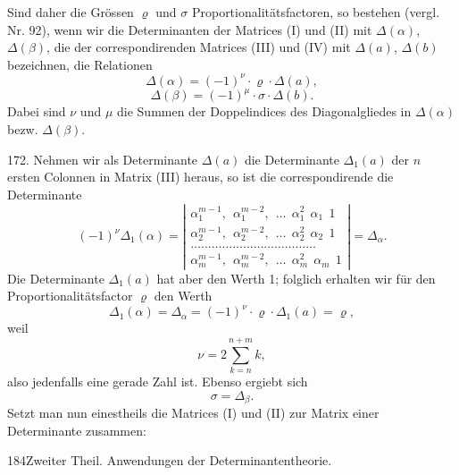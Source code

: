 \documentclass[11pt]{article}
\providecommand{\weberpage}[1]{}
\let\Delta\varDelta
\let\rho\varrho
\begin{document}
Sind daher die Grössen $\rho$ und $\sigma$ Proportionalitätsfactoren, so bestehen (vergl. Nr. 92), wenn wir die Determinanten der Matrices
(I) und (II) mit $\Delta(\alpha)$, $\Delta(\beta)$, die der correspondirenden Matrices (III)
und (IV) mit $\Delta(a)$, $\Delta(b)$ bezeichnen, die Relationen
\[
\Delta(\alpha) = (-1)^\nu\cdot\rho\cdot\Delta(a),
\]
\[
\Delta(\beta) = (-1)^\mu\cdot\sigma\cdot\Delta(b).
\]
Dabei sind $\nu$ und $\mu$ die Summen der Doppelindices des Diagonalgliedes in $\Delta(\alpha)$ bezw. $\Delta(\beta)$.

172. Nehmen wir als Determinante $\Delta(a)$ die Determinante $\Delta_1(a)$
der $n$ ersten Colonnen in Matrix (III) heraus, so ist die correspondirende die Determinante
\[
(-1)^\nu\Delta_1(\alpha) =
\left|\begin{array}{l}
\alpha_1^{m-1},\ \ \alpha_1^{m-2},\ \ \ldots\ \ \alpha_1^{2}\ \ \alpha_1\ \ 1\\
\alpha_2^{m-1},\ \ \alpha_2^{m-2},\ \ \ldots\ \ \alpha_2^{2}\ \ \alpha_2\ \ 1\\
\ldots\ldots\ldots\ldots\ldots\ldots\ldots\ldots\ldots\ldots\ldots\ldots\\
\alpha_m^{m-1},\ \ \alpha_m^{m-2},\ \ \ldots\ \ \alpha_m^{2}\ \ \alpha_m\ \ 1
\end{array}\right|
= \Delta_\alpha.
\]
Die Determinante $\Delta_1(a)$ hat aber den Werth 1; folglich erhalten wir
für den Proportionalitätsfactor $\rho$ den Werth
\[
\Delta_1(\alpha) = \Delta_\alpha = (-1)^\nu\cdot\rho\cdot\Delta_1(a) = \rho,
\]
weil
\[
\nu = 2\sum_{k=n}^{n+m} k,
\]
also jedenfalls eine gerade Zahl ist. Ebenso ergiebt sich
\[
\sigma = \Delta_\beta.
\]
Setzt man nun einestheils die Matrices (I) und (II) zur Matrix einer
Determinante zusammen:


\weberpage{184}
184\quad Zweiter Theil. Anwendungen der Determinantentheorie.
\end{document}
